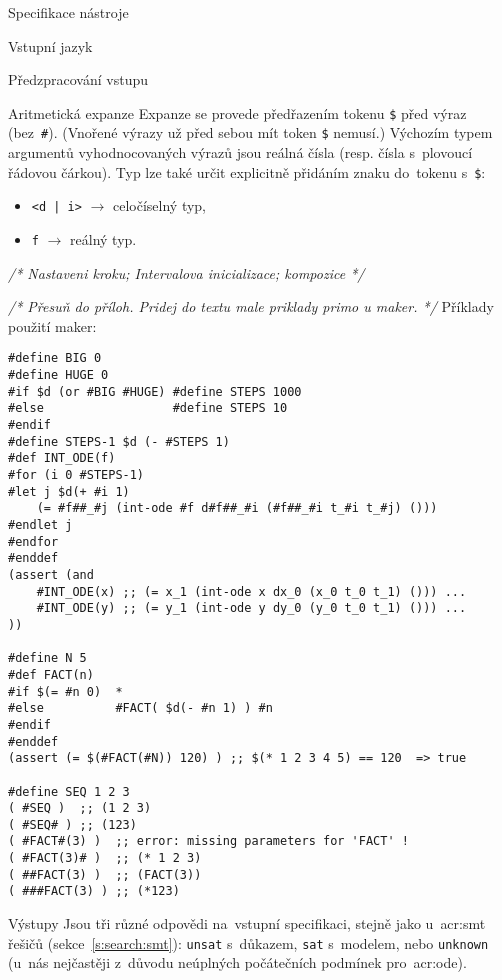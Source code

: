 \documentclass[thesis=M,czech]{FITthesis}[2012/06/26]
\newcommand{\acrlabel}[1]{acr:#1}
\newcommand{\acr}[1]{\acrshort{\acrlabel{#1}}}
\newcommand{\cmt}[1]{\textit{/* #1 */}}
\newcommand{\id}[1]{\texttt{#1}}
\newcommand{\rf}[1]{\ref{#1}}
\begin{document}
\begin{section}{Specifikace nástroje}
\begin{subsection}{Vstupní jazyk}
\begin{subsubsection}{Předzpracování vstupu}
\begin{paragraph}{Aritmetická expanze}
Expanze se provede předřazením tokenu \id{\$} před výraz (bez~\id{\#}).
(Vnořené výrazy už před sebou mít token \id{\$} nemusí.)
Výchozím typem argumentů vyhodnocovaných výrazů
jsou reálná čísla (resp. čísla s~plovoucí řádovou čárkou).
Typ lze také určit explicitně
přidáním znaku do~tokenu s~\id{\$}:
\begin{itemize}
\item \id{<d | i>} $\rightarrow$ celočíselný typ,
\item \id{f} $\rightarrow$ reálný typ.
\end{itemize}
\end{paragraph} %


\bigskip

\cmt{Nastaveni kroku; Intervalova inicializace; kompozice}

\cmt{Přesuň do příloh. Pridej do textu male priklady primo u maker.}
Příklady použití maker:
\begin{verbatim}
#define BIG 0
#define HUGE 0
#if $d (or #BIG #HUGE) #define STEPS 1000
#else                  #define STEPS 10
#endif
#define STEPS-1 $d (- #STEPS 1)
#def INT_ODE(f)
#for (i 0 #STEPS-1)
#let j $d(+ #i 1)
    (= #f##_#j (int-ode #f d#f##_#i (#f##_#i t_#i t_#j) ()))
#endlet j
#endfor
#enddef
(assert (and
    #INT_ODE(x) ;; (= x_1 (int-ode x dx_0 (x_0 t_0 t_1) ())) ...
    #INT_ODE(y) ;; (= y_1 (int-ode y dy_0 (y_0 t_0 t_1) ())) ...
))

#define N 5
#def FACT(n)
#if $(= #n 0)  *
#else          #FACT( $d(- #n 1) ) #n
#endif
#enddef
(assert (= $(#FACT(#N)) 120) ) ;; $(* 1 2 3 4 5) == 120  => true

#define SEQ 1 2 3
( #SEQ )  ;; (1 2 3)
( #SEQ# ) ;; (123)
( #FACT#(3) )  ;; error: missing parameters for 'FACT' !
( #FACT(3)# )  ;; (* 1 2 3)
( ##FACT(3) )  ;; (FACT(3))
( ###FACT(3) ) ;; (*123)
\end{verbatim}
\end{subsubsection} %


\end{subsection} %


\begin{subsection}{Výstupy}\label{ss:design:spec:out}
Jsou tři různé odpovědi na~vstupní specifikaci,
stejně jako u~\acr{smt} řešičů
(sekce~\rf{s:search:smt}):
\id{unsat} s~důkazem, \id{sat} s~modelem,
nebo \id{unknown}
(u~nás nejčastěji z~důvodu neúplných
počátečních podmínek pro~\acr{ode}).


\end{subsection}
\end{section}
\end{document}
